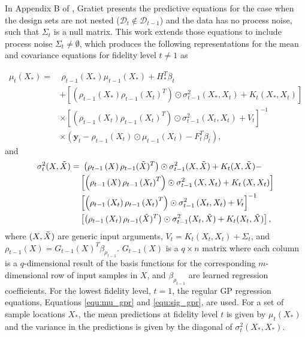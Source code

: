 In Appendix B of \cite{gratiet_multi-fidelity_nodate}, Gratiet presents the predictive equations for the case when the design sets are not nested ($\mathcal{D}_t \notin \mathcal{D}_{t-1}$) and the data has no process noise, such that $\Sigma_t$ is a null matrix.
This work extends those equations to include process noise $\Sigma_t \neq \emptyset$, which produces the following representations for the mean and covariance equations for fidelity level $t \neq 1$ as

\begin{equation}\label{equ:mu_Zt}
\begin{split}
    \mu_{t}(X_*) = & ~ \rho_{t-1} \left ( X_* \right ) \mu_{t-1} \left (X_* \right ) + H_*^T\beta_t \\
    & + \left [ \left ( \rho_{t-1} \left (X_* \right ) \rho_{t-1} \left (X_t \right )^T \right ) \odot \sigma^2_{t-1} \left(X_*,X_t \right) + K_{t} \left(X_*,X_t \right)\right] \\ 
    & \times \left [ \left ( \rho_{t-1} \left (X_t \right ) \rho_{t-1} \left (X_t \right )^T \right ) \odot \sigma^2_{t-1} \left(X_t,X_t \right) + V_t \right ]^{-1} \\ 
    & \times \left (\mathbf{y}_t - \rho_{t-1} \left (X_t \right ) \odot \mu_{t-1} \left (X_t \right) - F_t^T \beta_t \right),
\end{split}
\end{equation}
and
\begin{equation}\label{equ:sig_Zt}
\begin{split}
    \sigma^2_{t}(X, \Tilde{X}) = & ~ \left (\rho_{t-1} \left ( X \right ) \rho_{t-1} ( \Tilde{X})^T \right ) \odot \sigma^2_{t-1} (X, \Tilde{X}) + K_t(X, \Tilde{X}) - \\
    & \left [ \left ( \rho_{t-1} \left (X \right ) \rho_{t-1} \left (X_t \right )^T \right ) \odot \sigma^2_{t-1} \left(X,X_t \right) + K_{t} \left(X,X_t \right)\right] \\ 
    & \left [ \left ( \rho_{t-1} \left (X_t \right ) \rho_{t-1} \left (X_t \right )^T \right ) \odot \sigma^2_{t-1} \left(X_t,X_t \right) + V_t \right ]^{-1} \\ 
    & \left [ \left ( \rho_{t-1} \left (X_t \right ) \rho_{t-1} ( \Tilde{X} )^T \right ) \odot \sigma^2_{t-1} (X_t, \Tilde{X} ) + K_{t} ( X_t, \Tilde{X} ) \right], 
\end{split}
\end{equation}
where $(X, \Tilde{X})$ are generic input arguments, $V_t = K_{t} \left(X_t,X_t \right) + \Sigma_t $, and $\rho_{t-1} (X) = G_{t-1}(X)^T \beta_{\rho_{t-1}}$.
$G_{t-1}(X)$ is a $q \times n$ matrix where each column is a $q$-dimensional result of the basis functions for the corresponding $m$-dimensional row of input samples in $X$, and $\beta_{\rho_{t-1}}$ are learned regression coefficients.
For the lowest fidelity level, $t=1$, the regular GP regression equations, Equations \ref{equ:mu_gpr} and \ref{equ:sig_gpr}, are used.
For a set of sample locations $X_*$, the mean predictions at fidelity level $t$ is given by $\mu_t(X_*)$ and the variance in the predictions is given by the diagonal of $\sigma^2_t(X_*,X_*)$. 

